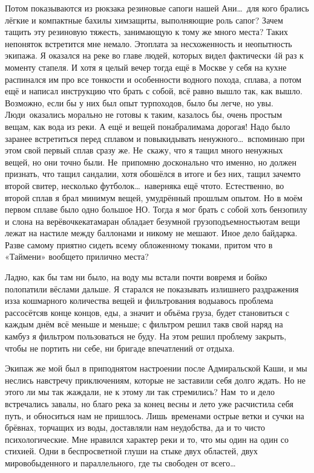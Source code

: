 Потом показываются из рюкзака резиновые сапоги нашей Ани\ldots~для кого брались лёгкие и компактные бахилы химзащиты, выполняющие роль сапог? Зачем тащить эту резиновую тяжесть, занимающую к тому же много места? Таких непоняток встретится мне немало. Это\mdash плата за несхоженность и неопытность экипажа. Я оказался на реке во главе людей, которых видел фактически 4\sdash й раз к моменту стапеля. И хотя я целый вечер тогда ещё в Москве у себя на кухне распинался им про все тонкости и особенности водного похода, сплава, а потом ещё и написал инструкцию что брать с собой, всё равно вышло так, как вышло. Возможно, если бы у них был опыт турпоходов, было бы легче, но увы. Люди~оказались морально не готовы к таким, казалось бы, очень простым вещам, как вода из реки. А ещё и вещей понабрали\mdash мама дорогая! Надо было заранее встретиться перед сплавом и повыкидывать ненужного\ldots~вспоминаю при этом свой первый сплав сразу же. Не~скажу, что я тащил много ненужных вещей, но они точно были. Не~припомню досконально что именно, но должен признать, что тащил сандалии, хотя обошёлся в итоге и без них, тащил зачем\sdash то второй свитер, несколько футболок\ldots~наверняка ещё что\sdash то. Естественно, во второй сплав я брал минимум вещей, умудрённый прошлым опытом. Но в моём первом сплаве было одно большое НО. Тогда я мог брать с собой хоть бензопилу и слона на верёвочке\mdash катамаран обладает безумной грузоподъемностью\mdash там вещи лежат на настиле между баллонами и никому не мешают. Иное дело байдарка. Разве самому приятно сидеть всему обложенному тюками, притом что в «Таймени» вообще\sdash то прилично места? 

Ладно, как бы там ни было, на воду мы встали почти вовремя и бойко полопатили вёслами дальше. Я старался не показывать излишнего раздражения из\sdash за кошмарного количества вещей и фильтрования воды\mdash авось проблема рассосётся\mdash в конце концов, еды, а значит и объёма груза, будет становиться с каждым днём всё меньше и меньше; с фильтром решил так\mdash в свой наряд на камбуз я фильтром пользоваться не буду. На этом решил проблему закрыть, чтобы не портить ни себе, ни бригаде впечатлений от отдыха.

Экипаж же мой был в приподнятом настроении после Адмиральской Каши, и мы неслись навстречу приключениям, которые не заставили себя долго ждать. Но не этого ли мы так жаждали, не к этому ли так стремились? Нам~то и дело встречались завалы, но благо река за конец весны и лето уже расчистила себя путь, и обноситься нам не пришлось. Лишь~временами острые ветки и сучки на брёвнах, торчащих из воды, доставляли нам неудобства, да и то чисто психологические. Мне нравился характер реки и то, что мы один на один со стихией. Одни в беспросветной глуши на стыке двух областей, двух миров\mdash обыденного и параллельного, где ты свободен от всего\ldots~

